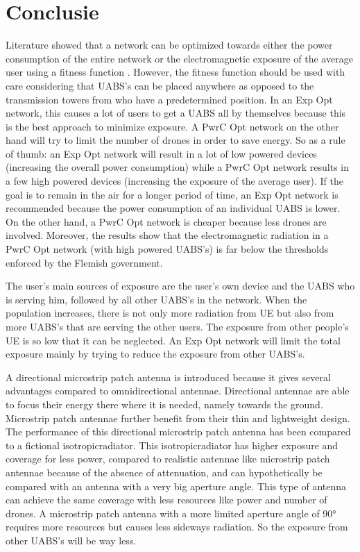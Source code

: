 \documentclass[twocolumn]{phdsymp_dutch}
\begin{document}
\section{Conclusie}
Literature showed that a network can be optimized towards either the power consumption of the entire network 
or the electromagnetic exposure of the average user using a fitness function \cite{J1}.
However, the fitness function should be used with care considering that \gls{UABS}'s can be placed anywhere as opposed to 
the transmission towers from \cite{J1} who have a predetermined position. 
In an \gls{Exp Opt} network, this causes a lot of users to get a \gls{UABS} all by 
themselves because this is the best approach to minimize exposure.
A \gls{PwrC Opt} network on the other hand will try to limit the number of drones 
in order to save energy. 
So as a rule of thumb: an \gls{Exp Opt} network will result in a lot of low powered devices (increasing the overall power consumption)
while a \gls{PwrC Opt} network results in a few high powered devices (increasing the exposure of the average user).
If the goal is to remain in the air for a longer period of time, an \gls{Exp Opt} network is recommended because the power consumption of 
an individual \gls{UABS} is lower.
On the other hand, a \gls{PwrC Opt} network is cheaper because less drones are involved. 
Moreover, the results show that the electromagnetic radiation in a \gls{PwrC Opt} network (with high powered \gls{UABS}'s)
is far below the thresholds enforced by the Flemish government.

The user's main sources of exposure are the user's own device and the \gls{UABS} who is serving him, followed by all
other \gls{UABS}'s in the network. 
When the population increases, there is not only more radiation from \gls{UE} but also 
from more \gls{UABS}'s that are serving the other users.
The exposure from other people's \gls{UE} is so low that it can be neglected.
An \gls{Exp Opt} network will limit the total exposure mainly by trying to reduce the exposure from other \gls{UABS}'s.

A directional microstrip patch antenna is introduced because it gives several advantages compared to omnidirectional antennae.
Directional antennae are able to focus their energy there where it is needed, namely towards the ground. Microstrip patch antennae 
further benefit from their thin and lightweight design. The performance 
of this directional microstrip patch antenna has been compared to a 
fictional \gls{isotropicradiator}.
This \gls{isotropicradiator} has higher exposure and coverage for less power, compared to realistic antennae like microstrip patch antennae
because of the absence of attenuation, and can hypothetically be compared with an antenna with a very big aperture angle.
This type of antenna can achieve the same coverage with less
resources like power and number of drones. 
A microstrip patch antenna with a more limited aperture angle of \ang{90} requires more resources but 
causes less sideways radiation. So the exposure from other \gls{UABS}'s will be way less.
\end{document}
